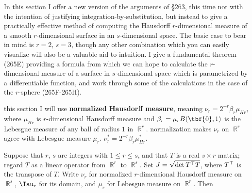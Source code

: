 
\def\chaptername{Change of variable in the integral}
\def\sectionname{Surface measures}


In this section I offer a new version of the arguments of \S263, this
time not with the intention of justifying integration-by-substitution,
but instead to give a practically effective method of computing the
Hausdorff $r$-dimensional measure of a smooth $r$-dimensional surface
in an $s$-dimensional space.   The basic case to bear in mind is $r=2$,
$s=3$, though any other combination which you can easily visualize
will also be a valuable aid to intuition.   I give a fundamental theorem
(265E) providing a formula from which we can hope to calculate the
$r$-dimensional measure of a surface in $s$-dimensional space which is
parametrized by a differentiable function, and work through some of
the calculations in the case of the $r$-sphere
(265F-265H). %

this section I will use {\bf normalized Hausdorff measure}, meaning
$\nu_r=2^{-r}\beta_r\mu_{Hr}$, where $\mu_{Hr}$ is $r$-dimensional
Hausdorff measure and
$\beta_r=\mu_rB(\tbf{0},1)$ is the Lebesgue measure of any ball
of radius $1$ in $\BbbR^r$.       normalization
makes $\nu_r$ on $\BbbR^r$ agree with Lebesgue measure $\mu_r$.
$\nu_r^*=2^{-r}\beta_r\mu_{Hr}^*$.

 Suppose that $r$, $s$ are integers with
$1\le r\le s$, and that $T$ is a real $s\times r$ matrix;  regard $T$
as
a linear operator from $\BbbR^r$ to $\BbbR^s$.   Set
$J=\sqrt{\det T^{\top} T}$,
where $T^{\top} $ is the transpose of $T$.   Write $\nu_r$ for normalized
$r$-dimensional Hausdorff measure on $\BbbR^s$, $\Tau_r$ for its
domain,
and $\mu_r$ for Lebesgue measure on $\BbbR^r$.   Then


